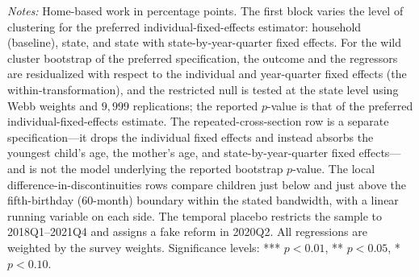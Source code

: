 \begin{table}[H]\centering
\caption{Inference and Estimator Robustness of the Home-Based-Work Effect}
\label{tab:inference}\small
{}
\par\vspace{3pt}\footnotesize\raggedright \textit{Notes:} Home-based work in percentage points. The first block varies the level of clustering for the preferred individual-fixed-effects estimator: household (baseline), state, and state with state-by-year-quarter fixed effects. For the wild cluster bootstrap of the preferred specification, the outcome and the regressors are residualized with respect to the individual and year-quarter fixed effects (the within-transformation), and the restricted null is tested at the state level using Webb weights and $9{,}999$ replications; the reported $p$-value is that of the preferred individual-fixed-effects estimate. The repeated-cross-section row is a separate specification---it drops the individual fixed effects and instead absorbs the youngest child's age, the mother's age, and state-by-year-quarter fixed effects---and is not the model underlying the reported bootstrap $p$-value. The local difference-in-discontinuities rows compare children just below and just above the fifth-birthday (60-month) boundary within the stated bandwidth, with a linear running variable on each side. The temporal placebo restricts the sample to 2018Q1--2021Q4 and assigns a fake reform in 2020Q2. All regressions are weighted by the survey weights. Significance levels: *** $p<0.01$, ** $p<0.05$, * $p<0.10$.
\end{table}
